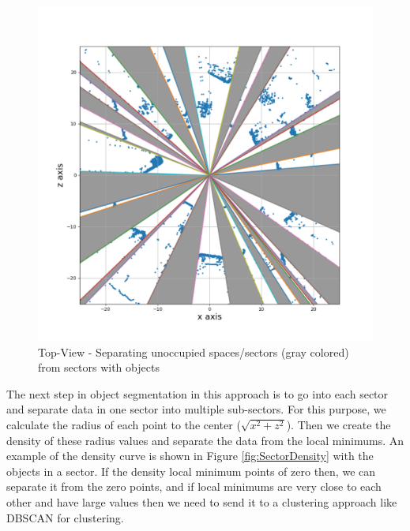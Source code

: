 \begin{figure}[!h]
\begin{minipage}{0.40\textwidth}
        \includegraphics[scale=0.3]{./images/sector-transforms/scene-with-sector.pdf}
        \caption{Top-View - Separating unoccupied spaces/sectors (gray colored) from sectors with objects}
        \label{fig:sectors2}
\end{minipage}%
\end{figure}
The next step in object segmentation in this approach is to go into each sector and separate data in one sector into multiple sub-sectors.
For this purpose, we calculate the radius of each point to the center ($\sqrt{x^2 + z^2 } $). 
Then we create the density of these radius values and separate the data from the local minimums.  
An example of the density curve is shown in Figure \ref{fig:SectorDensity} with the objects in a sector. 
If the density local minimum points of zero then, we can separate it from the zero points, and if local minimums are very close to each other 
and have large values then we need to send it to a clustering approach like DBSCAN for clustering.

